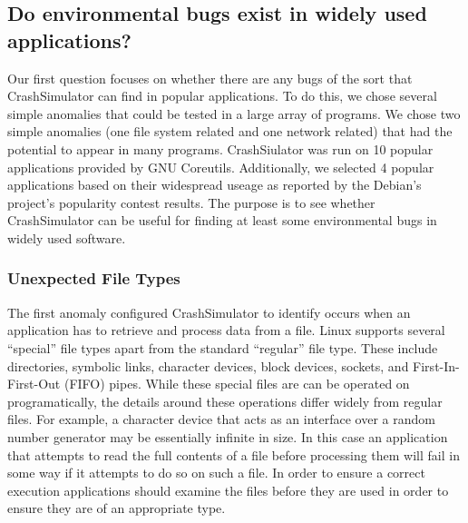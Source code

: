 \subsection{Do environmental bugs  exist in widely used applications?}


Our first question focuses on whether there are any bugs of the sort that
CrashSimulator can find in popular applications.  To do this, we 
chose several simple anomalies that could be tested in a large
array of programs.  We chose two simple anomalies (one file system
related and one network related) that had the potential to appear in
many programs. CrashSiulator was run on 10 popular applications provided by GNU Coreutils.
Additionally, we selected 4 popular applications based on their widespread useage
as reported by the Debian's project's popularity contest results.
The purpose is to see whether CrashSimulator can be useful
for finding at least some environmental bugs in widely used software.


\subsubsection{Unexpected File Types}

The first anomaly configured CrashSimulator to identify occurs when an
application has to retrieve and process data from a file.  Linux supports
several ``special'' file types apart from the standard ``regular'' file type.
These include directories, symbolic links, character devices, block devices,
sockets, and First-In-First-Out (FIFO) pipes.  While these special files are can
be operated on programatically, the details around these operations differ
widely from regular files.  For example, a character device that acts as an
interface over a random number generator may be essentially infinite in size.
In this case an application that attempts to read the full contents of a file
before processing them will fail in some way if it attempts to do so on such a
file.  In order to ensure a correct execution applications should examine the
files before they are used in order to ensure they are of an appropriate type.

